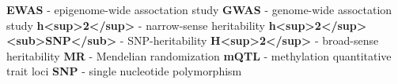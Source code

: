 \documentclass[11pt,twoside]{bristolthesis}
\begin{document}
  \begin{abbreviations}
    \textbf{EWAS} - epigenome-wide assoctation study
    \textbf{GWAS} - genome-wide assoctation study
    \textbf{h<sup>2</sup>} - narrow-sense heritability
    \textbf{h<sup>2</sup><sub>SNP</sub>} - SNP-heritability
    \textbf{H<sup>2</sup>} - broad-sense heritability
    \textbf{MR} - Mendelian randomization
    \textbf{mQTL} - methylation quantitative trait loci
    \textbf{SNP} - single nucleotide polymorphism
  \end{abbreviations}
\end{document}
